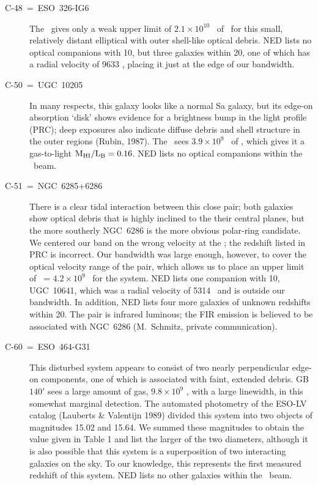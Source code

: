 \begin{description}
\item[C-48~=~ESO~326-IG6] 
The \ gives only a weak upper limit of 
\hbox{$2.1 \times 10^{10}$ \MSUN} of 
\HI\ for this small, relatively distant elliptical with outer 
shell-like optical debris.  NED lists no optical companions with 10\AMIN, 
but three galaxies within 20\AMIN, one of which has 
a radial velocity of 9633 \KMS, placing it just at the edge of our bandwidth.

\item[C-50~=~UGC~10205] 
In many respects, this galaxy looks like a normal Sa galaxy, but its 
edge-on absorption `disk' shows evidence for a brightness bump 
in the light profile (PRC); deep exposures also indicate diffuse debris and 
shell structure in the outer regions (Rubin, 1987).  
The \ sees $3.9 \times 10^9$ \MSUN\ of \HI, which gives it 
a gas-to-light $\rm M_{\rm HI}/L_{B} = 0.16$.
NED lists no optical companions within the \ beam.

\item[C-51~=~NGC~6285+6286] 
There is a clear tidal interaction between this close pair; both galaxies 
show optical 
debris that is highly inclined to the their central planes, but 
the more southerly NGC~6286 is the more obvious polar-ring candidate.  
We centered our band on the wrong velocity at the ; the redshift 
listed in PRC is incorrect.  Our bandwidth was large enough, 
however, to cover the optical velocity range of the pair, which allows us 
to place an upper limit of \MHI\ = $4.2 \times 10^9$ \MSUN\ for the system. 
NED lists one companion with 10\AMIN, UGC~10641, which was a radial 
velocity of 5314 \KMS\ and is outside our bandwidth.  In addition, NED 
lists four more galaxies of unknown redshifts within 20\AMIN.  
The pair is infrared luminous; the FIR emission 
is believed to be associated with NGC~6286 (M.~Schmitz, private communication).

\item[C-60~=~ESO~464-G31] 
This disturbed system appears to consist of two nearly perpendicular 
edge-on components, one of which is associated with faint, extended debris.  
GB $140'$ sees a large amount of gas, $9.8 \times 10^9$ \MSUN, with a large 
linewidth, in this somewhat marginal detection.  The automated photometry of 
the ESO-LV catalog (Lauberts \& Valentijn 1989) divided this system into two 
objects of magnitudes 15.02 and 15.64.  We summed these magnitudes 
to obtain the value given in Table 1 and list the larger of the two diameters, 
although it is also possible that this system is a superposition of two 
interacting galaxies on the sky.  
To our knowledge, this represents the first measured redshift of this 
system.  NED lists no other galaxies within the \ beam.  


\end{description}
